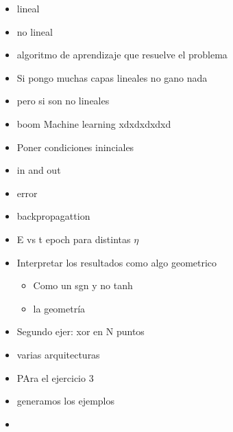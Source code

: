 \begin{itemize}
	\item lineal
	\item no lineal
	\item algoritmo de aprendizaje que resuelve el problema
	\item Si pongo muchas capas lineales no gano nada
	\item pero si son no lineales
	\item boom Machine learning xdxdxdxdxd
\end{itemize}



\begin{itemize}
	\item Poner condiciones ininciales
	\item in and out
	\item error
	\item backpropagattion
	\item E vs t epoch para distintas $\eta$
	\item Interpretar los resultados como algo geometrico
	\begin{itemize}
		\item Como un sgn y no tanh
		\item la geometría 
	\end{itemize}
	\item Segundo ejer: xor en N puntos
	\item varias arquitecturas
	\item PAra el ejercicio 3
	\item generamos los ejemplos
	\item 
\end{itemize}

